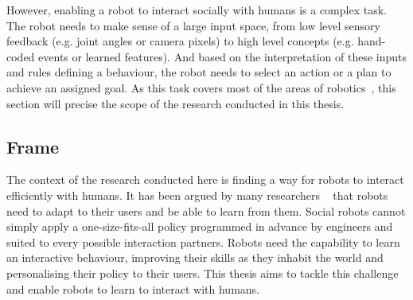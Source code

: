 


However, enabling a robot to interact socially with humans is a complex task. The robot needs to make sense of a large input space, from low level sensory feedback (e.g. joint angles or camera pixels) to high level concepts (e.g. hand-coded events or learned features). And based on the interpretation of these inputs and rules defining a behaviour, the robot needs to select an action or a plan to achieve an assigned goal. As this task covers most of the areas of robotics~\citep{fong2003survey}, this section will precise the scope of the research conducted in this thesis.

\subsection{Frame}

The context of the research conducted here is finding a way for robots to interact efficiently with humans. It has been argued by many researchers ~\citep{dautenhahn2004robots,billard2008robot} that robots need to adapt to their users and be able to learn from them. Social robots cannot simply apply a one-size-fits-all policy programmed in advance by engineers and suited to every possible interaction partners. Robots need the capability to learn an interactive behaviour, improving their skills as they inhabit the world and personalising their policy to their users. This thesis aims to tackle this challenge and enable robots to learn to interact with humans.

